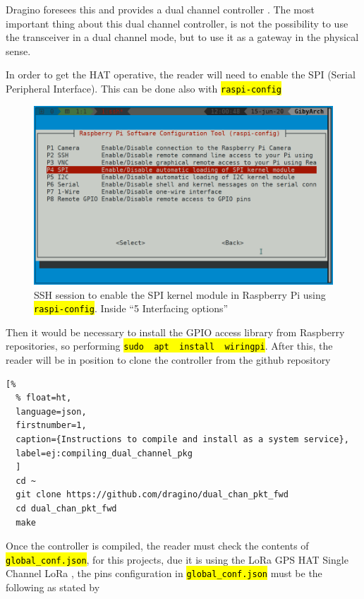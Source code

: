\documentclass[11pt,a4paper,dvipsnames,twoside]{article}
\newcommand{\cmd}[1] {\hl{\texttt{#1}}}
\begin{document}
Dragino foresees this and provides a dual channel controller \cite{Dragino_DualChannelController_Rpi}. The most important thing about this dual channel controller, is not the possibility to use the transceiver in a dual channel mode, but to use it as a gateway in the physical sense.

In order to get the HAT operative, the reader will need to enable the SPI (Serial Peripheral Interface). This can be done also with \cmd{raspi-config} 

\begin{figure}[ht]
  \centering
  \includegraphics[width=.9\textwidth]{../pictures/SPI_raspi-config.png}
  \caption{SSH session to enable the SPI kernel module in Raspberry Pi using \cmd{raspi-config}. Inside \enquote{5 Interfacing options}}
  \label{fig:EnablingSPI}
\end{figure}

Then it would be necessary to install the GPIO access library from Raspberry repositories, so performing \cmd{sudo\, apt\, install\, wiringpi}. After this, the reader will be in position to clone the controller from the github repository \cite{Dragino_DualChannelController_Rpi}

\begin{lstlisting}[%
  % float=ht,
  language=json,
  firstnumber=1,
  caption={Instructions to compile and install as a system service},
  label=ej:compiling_dual_channel_pkg
  ]
  cd ~
  git clone https://github.com/dragino/dual_chan_pkt_fwd
  cd dual_chan_pkt_fwd
  make
\end{lstlisting}

Once the controller is compiled, the reader must check the contents of \cmd{global\_conf.json}, for this projects, due it is using the LoRa GPS HAT Single Channel LoRa \cite{DraginoRpiHat}, the pins configuration in \cmd{global\_conf.json} must be the following as stated by \cite{Dragino_DualChannelController_Rpi}
\end{document}
